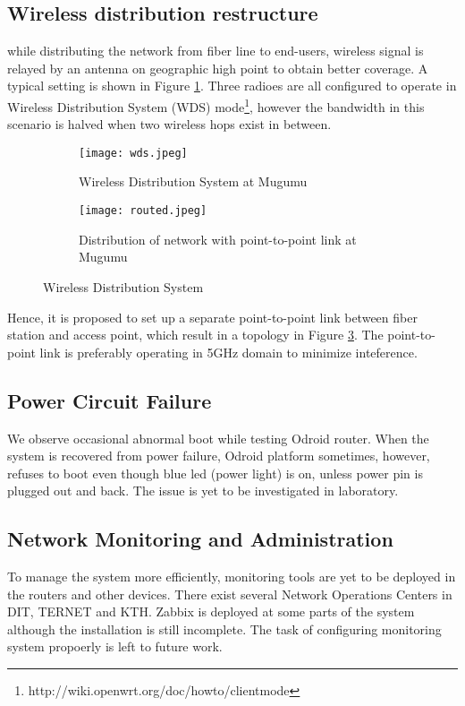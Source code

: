 \subsection{Wireless distribution restructure}
while distributing the network from fiber line to end-users, wireless signal is relayed by an antenna on geographic high point to obtain better coverage. A typical setting is shown in Figure \ref{wds}. Three radioes are all configured to operate in Wireless Distribution System (WDS) mode\footnote{http://wiki.openwrt.org/doc/howto/clientmode}, however the bandwidth in this scenario is halved when two wireless hops exist in between.

\begin{figure}[htbp]
\centering
\begin{subfigure}{0.45\textwidth}
\centering
\texttt{[image: wds.jpeg]}
\caption{Wireless Distribution System at Mugumu}
\label{wds}
\end{subfigure}
\begin{subfigure}{0.45\textwidth}
\centering
\texttt{[image: routed.jpeg]}
\caption{Distribution of network with point-to-point link at Mugumu}
\label{ptp}
\end{subfigure}
\caption{Wireless Distribution System}
\end{figure}

Hence, it is proposed to set up a separate point-to-point link between fiber station and access point, which result in a topology in Figure \ref{ptp}. The point-to-point link is preferably operating in 5GHz domain to minimize inteference.

\subsection{Power Circuit Failure}
We observe occasional abnormal boot while testing Odroid router. When the system is recovered from power failure, Odroid platform sometimes, however, refuses to boot even though blue led (power light) is on, unless power pin is plugged out and back. The issue is yet to be investigated in laboratory.

\subsection{Network Monitoring and Administration}
To manage the system more efficiently, monitoring tools are yet to be deployed in the routers and other devices. There exist several Network Operations Centers in DIT, TERNET and KTH. Zabbix is deployed at some parts of the system although the installation is still incomplete. The task of configuring monitoring system propoerly is left to future work.